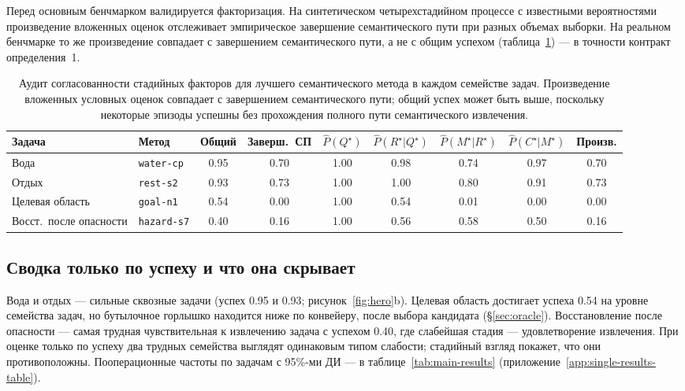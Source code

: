 \documentclass{article}
\begin{document}
Перед основным бенчмарком валидируется факторизация. На
синтетическом четырехстадийном процессе с известными вероятностями
произведение вложенных оценок отслеживает эмпирическое завершение семантического пути
при разных объемах выборки. На реальном бенчмарке то же произведение совпадает с
завершением семантического пути, а не с общим успехом
(таблица~\ref{tab:consistency}) --- в точности контракт
определения~1.

\begin{table}[t]
  \caption{Аудит согласованности стадийных факторов для лучшего семантического метода в каждом семействе задач. Произведение вложенных условных оценок совпадает с завершением семантического пути; общий успех может быть выше, поскольку некоторые эпизоды успешны без прохождения полного пути семантического извлечения.}
  \label{tab:consistency}
  \centering
  \small
  \begin{tabular}{p{1.7cm}p{2.5cm}c c c c c c c}
    \toprule
    Задача & Метод & Общий & Заверш.\ СП & $\hat P(Q^\star)$ & $\hat P(R^\star|Q^\star)$ & $\hat P(M^\star|R^\star)$ & $\hat P(C^\star|M^\star)$ & Произв. \\
    \midrule
    Вода & \texttt{water-cp} & 0.95 & 0.70 & 1.00 & 0.98 & 0.74 & 0.97 & 0.70 \\
    Отдых & \texttt{rest-s2} & 0.93 & 0.73 & 1.00 & 1.00 & 0.80 & 0.91 & 0.73 \\
    Целевая область & \texttt{goal-n1} & 0.54 & 0.00 & 1.00 & 0.54 & 0.01 & 0.00 & 0.00 \\
    Восст.\ после опасности & \texttt{hazard-s7} & 0.40 & 0.16 & 1.00 & 0.56 & 0.58 & 0.50 & 0.16 \\
    \bottomrule
  \end{tabular}
\end{table}

\subsection{Сводка только по успеху и что она скрывает}
\label{sec:single-results}

Вода и отдых --- сильные сквозные задачи (успех 0.95 и 0.93; рисунок~\ref{fig:hero}b). Целевая область достигает успеха 0.54 на уровне семейства задач, но бутылочное горлышко находится ниже по конвейеру, после выбора кандидата (\S\ref{sec:oracle}). Восстановление после опасности --- самая трудная чувствительная к извлечению задача с успехом 0.40, где слабейшая стадия --- удовлетворение извлечения. При оценке только по успеху два трудных семейства выглядят одинаковым типом слабости; стадийный взгляд покажет, что они противоположны. Пооперационные частоты по задачам с 95\%-ми ДИ --- в таблице~\ref{tab:main-results} (приложение~\ref{app:single-results-table}).
\end{document}
